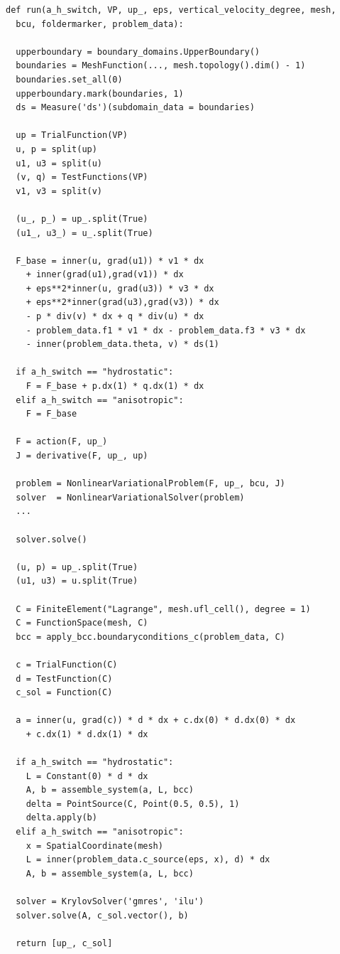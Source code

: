 \documentclass[12pt]{report}
\numberwithin{theorem}{chapter}
\numberwithin{corollary}{chapter}
\numberwithin{lemma}{chapter}
\numberwithin{remark}{chapter}
\numberwithin{definition}{chapter}
\numberwithin{prop}{chapter}
\begin{document}
\begin{verbatim}
def run(a_h_switch, VP, up_, eps, vertical_velocity_degree, mesh,
  bcu, foldermarker, problem_data):

  upperboundary = boundary_domains.UpperBoundary()
  boundaries = MeshFunction(..., mesh.topology().dim() - 1)
  boundaries.set_all(0)
  upperboundary.mark(boundaries, 1)
  ds = Measure('ds')(subdomain_data = boundaries)

  up = TrialFunction(VP)
  u, p = split(up)
  u1, u3 = split(u)
  (v, q) = TestFunctions(VP)
  v1, v3 = split(v)

  (u_, p_) = up_.split(True)
  (u1_, u3_) = u_.split(True)
    
  F_base = inner(u, grad(u1)) * v1 * dx
    + inner(grad(u1),grad(v1)) * dx
    + eps**2*inner(u, grad(u3)) * v3 * dx
    + eps**2*inner(grad(u3),grad(v3)) * dx
    - p * div(v) * dx + q * div(u) * dx
    - problem_data.f1 * v1 * dx - problem_data.f3 * v3 * dx
    - inner(problem_data.theta, v) * ds(1)
    
  if a_h_switch == "hydrostatic":
    F = F_base + p.dx(1) * q.dx(1) * dx
  elif a_h_switch == "anisotropic":
    F = F_base

  F = action(F, up_)
  J = derivative(F, up_, up)
    
  problem = NonlinearVariationalProblem(F, up_, bcu, J)
  solver  = NonlinearVariationalSolver(problem)
  ...

  solver.solve()
    
  (u, p) = up_.split(True)
  (u1, u3) = u.split(True)
    
  C = FiniteElement("Lagrange", mesh.ufl_cell(), degree = 1)
  C = FunctionSpace(mesh, C)
  bcc = apply_bcc.boundaryconditions_c(problem_data, C)
        
  c = TrialFunction(C)
  d = TestFunction(C)
  c_sol = Function(C)
    
  a = inner(u, grad(c)) * d * dx + c.dx(0) * d.dx(0) * dx
    + c.dx(1) * d.dx(1) * dx
    
  if a_h_switch == "hydrostatic":
    L = Constant(0) * d * dx
    A, b = assemble_system(a, L, bcc)
    delta = PointSource(C, Point(0.5, 0.5), 1)
    delta.apply(b)
  elif a_h_switch == "anisotropic":
    x = SpatialCoordinate(mesh)
    L = inner(problem_data.c_source(eps, x), d) * dx
    A, b = assemble_system(a, L, bcc)
    
  solver = KrylovSolver('gmres', 'ilu')
  solver.solve(A, c_sol.vector(), b)
    
  return [up_, c_sol]

\end{verbatim}
\end{document}
